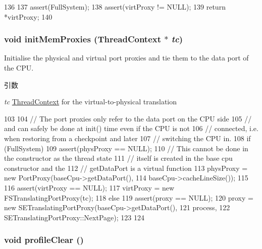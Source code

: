 \begin{DoxyCode}
136 {
137     assert(FullSystem);
138     assert(virtProxy != NULL);
139     return *virtProxy;
140 }
\end{DoxyCode}
\hypertarget{structThreadState_ab24719c7923d7d57030fa05bb166c62c}{
\subsubsection[{initMemProxies}]{\setlength{\rightskip}{0pt plus 5cm}void initMemProxies ({\bf ThreadContext} $\ast$ {\em tc})}}
\label{structThreadState_ab24719c7923d7d57030fa05bb166c62c}
Initialise the physical and virtual port proxies and tie them to the data port of the CPU.


\begin{DoxyParams}{引数}
\item[{\em tc}]\hyperlink{classThreadContext}{ThreadContext} for the virtual-\/to-\/physical translation \end{DoxyParams}



\begin{DoxyCode}
103 {
104     // The port proxies only refer to the data port on the CPU side
105     // and can safely be done at init() time even if the CPU is not
106     // connected, i.e. when restoring from a checkpoint and later
107     // switching the CPU in.
108     if (FullSystem) {
109         assert(physProxy == NULL);
110         // This cannot be done in the constructor as the thread state
111         // itself is created in the base cpu constructor and the
112         // getDataPort is a virtual function
113         physProxy = new PortProxy(baseCpu->getDataPort(),
114                                   baseCpu->cacheLineSize());
115 
116         assert(virtProxy == NULL);
117         virtProxy = new FSTranslatingPortProxy(tc);
118     } else {
119         assert(proxy == NULL);
120         proxy = new SETranslatingPortProxy(baseCpu->getDataPort(),
121                                            process,
122                                            SETranslatingPortProxy::NextPage);
123     }
124 }
\end{DoxyCode}
\hypertarget{structThreadState_acf9c88860776d7bd752317e8b550a5d5}{
\subsubsection[{profileClear}]{\setlength{\rightskip}{0pt plus 5cm}void profileClear ()}}
\label{structThreadState_acf9c88860776d7bd752317e8b550a5d5}



